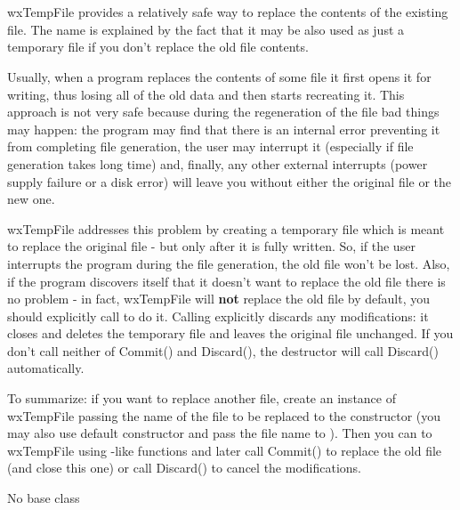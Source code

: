 \section{}\label{wxtempfile}

wxTempFile provides a relatively safe way to replace the contents of the
existing file. The name is explained by the fact that it may be also used as
just a temporary file if you don't replace the old file contents.

Usually, when a program replaces the contents of some file it first opens it for
writing, thus losing all of the old data and then starts recreating it. This
approach is not very safe because during the regeneration of the file bad things
may happen: the program may find that there is an internal error preventing it
from completing file generation, the user may interrupt it (especially if file
generation takes long time) and, finally, any other external interrupts (power
supply failure or a disk error) will leave you without either the original file
or the new one.

wxTempFile addresses this problem by creating a temporary file which is meant to
replace the original file - but only after it is fully written. So, if the user
interrupts the program during the file generation, the old file won't be lost.
Also, if the program discovers itself that it doesn't want to replace the old
file there is no problem - in fact, wxTempFile will {\bf not} replace the old
file by default, you should explicitly call  
to do it. Calling  explicitly discards any
modifications: it closes and deletes the temporary file and leaves the original
file unchanged. If you don't call neither of Commit() and Discard(), the
destructor will call Discard() automatically.

To summarize: if you want to replace another file, create an instance of
wxTempFile passing the name of the file to be replaced to the constructor (you
may also use default constructor and pass the file name to 
). Then you can  
to wxTempFile using -like functions and later call
Commit() to replace the old file (and close this one) or call Discard() to cancel
the modifications.


No base class

